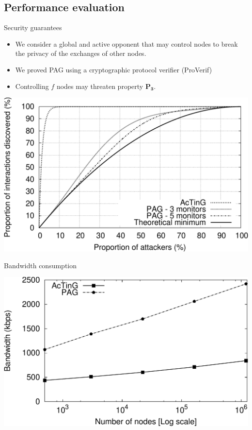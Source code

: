 \documentclass[10pt]{beamer}
\begin{document}
\subsection{Performance evaluation}
\begin{frame}{Security guarantees}{}
   \begin{itemize}
      \item We consider a global and active opponent that may control nodes to break the privacy of the exchanges of other nodes.
      \item We proved PAG using a cryptographic protocol verifier (ProVerif)
      \item Controlling $f$ nodes may threaten property $\mathbf{P_3}$.
   \end{itemize} 
  
   \begin{center}
      \includegraphics[height=.55\textheight]{fig/PAG/probaPrivacy}
   \end{center}
\end{frame}

\begin{frame}{Bandwidth consumption}{}
   \begin{center}
      \includegraphics[height=.55\textheight]{fig/PAG/scalability}
   \end{center}
\end{frame}
\end{document}
